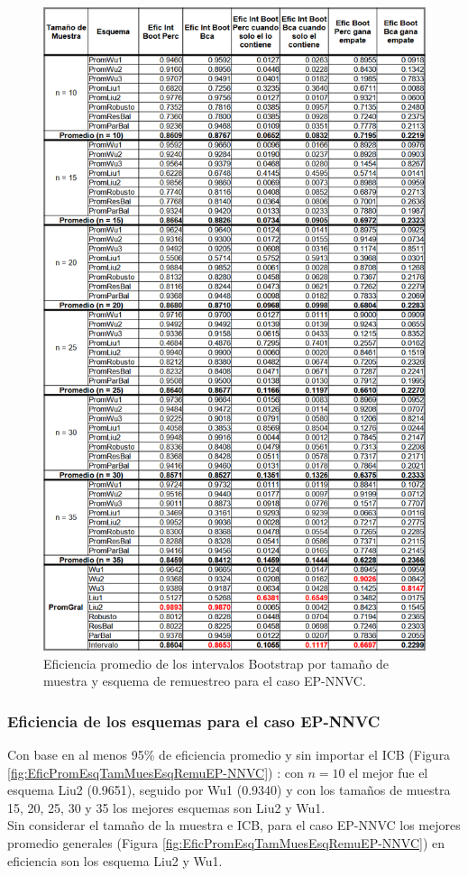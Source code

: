 \begin{figure}[ht] 
	\centering 
	\includegraphics[width=0.55\linewidth]{img/EP_NNVC_Efic_Boots.png} 
	\caption{Eficiencia promedio de los intervalos Bootstrap por tamaño de muestra y esquema de remuestreo para el caso EP-NNVC.} 
	\label{fig:EficPromIntBootsTamMuestEsqRemuEP-NNVC}
\end{figure}
\FloatBarrier


\subsubsection{Eficiencia de los esquemas para el caso EP-NNVC}
Con base en al menos 95\% de eficiencia promedio y sin importar el ICB (Figura \ref{fig:EficPromEsqTamMuesEsqRemuEP-NNVC}) : con $n=10$ el mejor fue el esquema Liu2 (0.9651), seguido por Wu1 (0.9340) y con los tamaños de muestra 15, 20, 25, 30 y 35 los mejores esquemas son Liu2 y Wu1.\\

Sin considerar el tamaño de la muestra e ICB, para el caso EP-NNVC los mejores promedio generales (Figura \ref{fig:EficPromEsqTamMuesEsqRemuEP-NNVC}) en eficiencia son los esquema Liu2 y Wu1.


